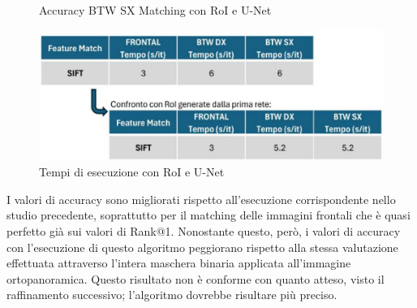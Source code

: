 \documentclass[12pt,a4paper,openright,twoside]{book}
\begin{document}
\begin{itemize}
\begin{figure}[H]
    	\caption{Accuracy BTW SX Matching con RoI e U-Net}
	\label{fig:sx5}
\end{figure}
\begin{figure}[H]
	\centering
	\includegraphics{figures/tempi5_1.pdf}
    	\caption{Tempi di esecuzione con RoI e U-Net}
	\label{fig:tempi5}
\end{figure}
\end{itemize}
I valori di accuracy sono migliorati rispetto all'esecuzione corrispondente nello studio precedente, soprattutto per il matching delle immagini frontali che è quasi perfetto già sui valori di Rank@1. Nonostante questo, però, i valori di accuracy con l'esecuzione di questo algoritmo peggiorano rispetto alla stessa valutazione effettuata attraverso l'intera maschera binaria applicata all'immagine ortopanoramica. Questo risultato non è conforme con quanto atteso, visto il raffinamento successivo; l'algoritmo dovrebbe risultare più preciso.
\end{document}
